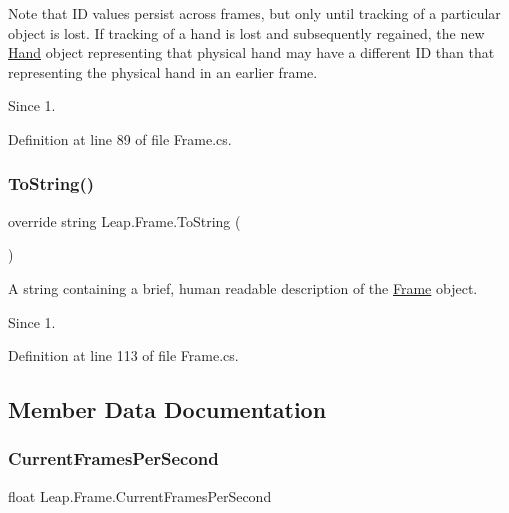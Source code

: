 Note that ID values persist across frames, but only until tracking of a particular object is lost. If tracking of a hand is lost and subsequently regained, the new \mbox{\hyperlink{class_leap_1_1_hand}{Hand}} object representing that physical hand may have a different ID than that representing the physical hand in an earlier frame. \begin{DoxySince}{Since}
1. 
\end{DoxySince}


Definition at line 89 of file Frame.\+cs.

\mbox{\label{class_leap_1_1_frame_a06555bb46574837e237ebe18f0f75fab}} 
\subsubsection{\texorpdfstring{ToString()}{ToString()}}
{\footnotesize\ttfamily override string Leap.\+Frame.\+To\+String (\begin{DoxyParamCaption}{ }\end{DoxyParamCaption})}



A string containing a brief, human readable description of the \mbox{\hyperlink{class_leap_1_1_frame}{Frame}} object. 

\begin{DoxySince}{Since}
1. 
\end{DoxySince}


Definition at line 113 of file Frame.\+cs.



\subsection{Member Data Documentation}
\mbox{\label{class_leap_1_1_frame_acf9127d430f61dc4ed2dfae8674c3a30}} 
\subsubsection{\texorpdfstring{CurrentFramesPerSecond}{CurrentFramesPerSecond}}
{\footnotesize\ttfamily float Leap.\+Frame.\+Current\+Frames\+Per\+Second}



